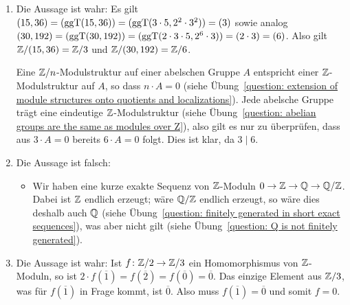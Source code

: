 \begin{solution}
  \begin{enumerate}
    \item
      Die Aussage ist wahr:
      Es gilt $(15,36) = (\operatorname{ggT}(15,36)) = (\operatorname{ggT}(3 \cdot 5, 2^2 \cdot 3^2)) = (3)$ sowie analog $(30,192)  = (\operatorname{ggT}(30,192)) = (\operatorname{ggT}(2 \cdot 3 \cdot 5, 2^6 \cdot 3)) = (2 \cdot 3) = (6)$.
      Also gilt $\mathbb{Z}/(15,36) = \mathbb{Z}/3$ und $\mathbb{Z}/(30,192) = \mathbb{Z}/6$.
      
      Eine $\mathbb{Z}/n$-Modulstruktur auf einer abelschen Gruppe $A$ entspricht einer $\mathbb{Z}$-Modulstruktur auf $A$, so dass $n \cdot A = 0$ (siehe Übung~\ref{question: extension of module structures onto quotients and localizations}).
      Jede abelsche Gruppe trägt eine eindeutige $\mathbb{Z}$-Modulstruktur (siehe Übung~\ref{question: abelian groups are the same as modules over Z}), also gilt es nur zu überprüfen, dass aus $3 \cdot A = 0$ bereits $6 \cdot A = 0$ folgt.
      Dies ist klar, da $3 \mid 6$.

    \item
      Die Aussage ist falsch:
      \begin{itemize}
        \item
          Wir haben eine kurze exakte Sequenz von $\mathbb{Z}$-Moduln $0 \to \mathbb{Z} \to \mathbb{Q} \to \mathbb{Q}/\mathbb{Z}$.
          Dabei ist $\mathbb{Z}$ endlich erzeugt;
          wäre $\mathbb{Q}/\mathbb{Z}$ endlich erzeugt, so wäre dies deshalb auch $\mathbb{Q}$ (siehe Übung~\ref{question: finitely generated in short exact sequences}), was aber nicht gilt (siehe Übung~\ref{question: Q is not finitely generated}).
      \end{itemize}
    
    \item
      Die Aussage ist wahr:
      Ist $f \colon \mathbb{Z}/2 \to \mathbb{Z}/3$ ein Homomorphismus von $\mathbb{Z}$-Moduln, so ist $2 \cdot f(\overline{1}) = f(\overline{2}) = f(\overline{0}) = \overline{0}$.
      Das einzige Element aus $\mathbb{Z}/3$, was für $f(\overline{1})$ in Frage kommt, ist $\overline{0}$.
      Also muss $f(\overline{1}) = \overline{0}$ und somit $f = 0$.
    

\end{enumerate}
\end{solution}
